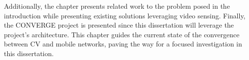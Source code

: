 Additionally, the chapter presents related work to the problem posed in the introduction while presenting existing solutions leveraging video sensing. Finally, the CONVERGE project is presented since this dissertation will leverage the project's architecture. This chapter guides the current state of the convergence between CV and mobile networks, paving the way for a focused investigation in this dissertation.





